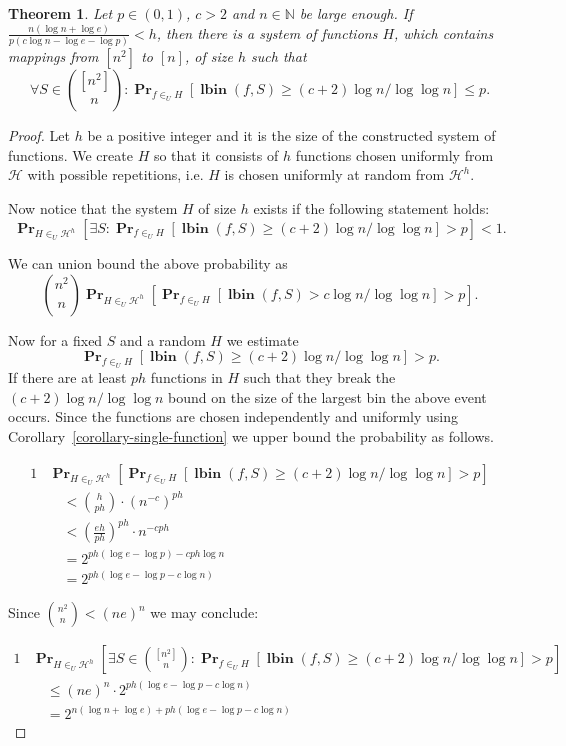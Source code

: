 \documentclass{article}
\newcommand{\lbin}[2]{\operatorname{\mathbf{lbin}}({#1}, {#2})}
\newcommand{\probs}[2]{\operatorname{\mathbf{Pr}}_{{#1}}\left[{#2}\right]}
\newtheorem{theorem}{Theorem}
\begin{document}
\begin{theorem}
\label{theorem-fixed-p-c}
Let $p \in (0, 1)$, $c > 2$ and $n \in \mathbb{N}$ be large enough. If $\frac{n(\log n + \log e)}{p(c \log n - \log e - \log{p})} < h$, then there is a system of functions $H$, which contains mappings from $[n^2]$ to $[n]$, of size $h$ such that 
\[
\forall S \in {[n^2] \choose n}\colon \probs{f \in_U H}{\lbin{f}{S} \geq (c + 2) \log n / \log \log n} \leq p.
\]
\end{theorem}
\begin{proof}
Let $h$ be a positive integer and it is the size of the constructed system of functions.
We create $H$ so that it consists of $h$ functions chosen uniformly from $\mathcal{H}$ with possible repetitions, i.e. $H$ is chosen uniformly at random from $\mathcal{H}^h$.

Now notice that the system $H$ of size $h$ exists if the following statement holds:
\[
\probs{H \in_U \mathcal{H}^h}{\exists S \colon \probs{f \in_U H}{\lbin{f}{S} \geq (c + 2) \log n / \log \log n } > p} < 1.
\]

We can union bound the above probability as
\[
{n^2 \choose n} \probs{H \in_U \mathcal{H}^h}{\probs{f \in_U H}{\lbin{f}{S} > c \log n / \log \log n } > p}.
\]

Now for a fixed $S$ and a random $H$ we estimate \[\probs{f \in_U H}{\lbin{f}{S} \geq (c + 2) \log n / \log \log n } > p.\]
If there are at least $ph$ functions in $H$ such that they break the $(c + 2)\log n / \log \log n$ bound on the size of the largest bin the above event occurs. Since the functions are chosen independently and uniformly using Corollary~\ref{corollary-single-function} we upper bound the probability as follows.

\begin{alignat*}{1}
& \probs{H \in_U \mathcal{H}^h}{\probs{f \in_U H}{\lbin{f}{S} \geq (c + 2) \log n / \log \log n} > p} \\
	& \quad < \binom{h}{ph} \cdot \left(n^{-c}\right)^{ph} \\
	& \quad < \left(\frac{eh}{ph}\right)^{ph} \cdot n^{-cph} \\
	& \quad = 2^{ph(\log e - \log{p}) -cph \log n} \\
	& \quad = 2^{ph(\log e - \log{p} -c \log n)}
\end{alignat*}

Since ${n^2 \choose n} < (ne)^n$ we may conclude:

\begin{alignat*}{1}
& \probs{H \in_U \mathcal{H}^h}{\exists S \in {[n^2] \choose n} \colon \probs{f \in_U H}{\lbin{f}{S} \geq (c + 2) \log n / \log \log n} > p} \\ 
	& \quad \leq (ne)^n \cdot 2^{ph(\log e - \log{p} -c \log n)} \\
	& \quad = 2^{n(\log n + \log e) + ph(\log e - \log{p} - c \log n)}
\end{alignat*}


\end{proof}
\end{document}
